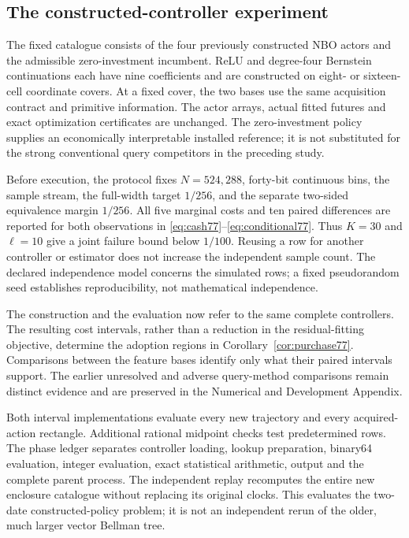 \subsection{The constructed-controller experiment}
The fixed catalogue consists of the four previously constructed NBO actors and the admissible zero-investment incumbent. ReLU and degree-four Bernstein continuations each have nine coefficients and are constructed on eight- or sixteen-cell coordinate covers. At a fixed cover, the two bases use the same acquisition contract and primitive information. The actor arrays, actual fitted futures and exact optimization certificates are unchanged. The zero-investment policy supplies an economically interpretable installed reference; it is not substituted for the strong conventional query competitors in the preceding study.

Before execution, the protocol fixes $N=524{,}288$, forty-bit continuous bins, the sample stream, the full-width target $1/256$, and the separate two-sided equivalence margin $1/256$. All five marginal costs and ten paired differences are reported for both observations in \eqref{eq:cash77}--\eqref{eq:conditional77}. Thus $K=30$ and $\ell=10$ give a joint failure bound below $1/100$. Reusing a row for another controller or estimator does not increase the independent sample count. The declared independence model concerns the simulated rows; a fixed pseudorandom seed establishes reproducibility, not mathematical independence.





The construction and the evaluation now refer to the same complete controllers. The resulting cost intervals, rather than a reduction in the residual-fitting objective, determine the adoption regions in Corollary~\ref{cor:purchase77}. Comparisons between the feature bases identify only what their paired intervals support. The earlier unresolved and adverse query-method comparisons remain distinct evidence and are preserved in the Numerical and Development Appendix.

Both interval implementations evaluate every new trajectory and every acquired-action rectangle. Additional rational midpoint checks test predetermined rows. The phase ledger separates controller loading, lookup preparation, binary64 evaluation, integer evaluation, exact statistical arithmetic, output and the complete parent process. The independent replay recomputes the entire new enclosure catalogue without replacing its original clocks. This evaluates the two-date constructed-policy problem; it is not an independent rerun of the older, much larger vector Bellman tree.
